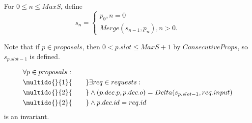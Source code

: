 \documentclass[12pt,a4paper,en]{pracamgr}
\newcommand{\ind}[1]{\multido{}{#1}{\qquad}}
\begin{document}
For $0 \le n \le MaxS$, define
$$ s_n = \begin{cases} p_0, n = 0\\ Merge(s_{n-1}, p_n), n > 0. \end{cases} $$

    Note that if $p \in proposals$, then $0 < p.slot \le MaxS + 1$ by $ConsecutiveProps$, so $s_{p.slot-1}$ is defined.

\begin{thm}\label{thm-descendant}
    \begin{align*}
        & \forall p \in proposals:\\
        & \ind{1} \exists req \in requests:\\
        & \ind{2} \land (p.dec.p, p.dec.o) = Delta(s_{p.slot - 1}, req.input)\\
        & \ind{2} \land p.dec.id = req.id
    \end{align*}
    is an invariant.
\end{thm}
\end{document}
